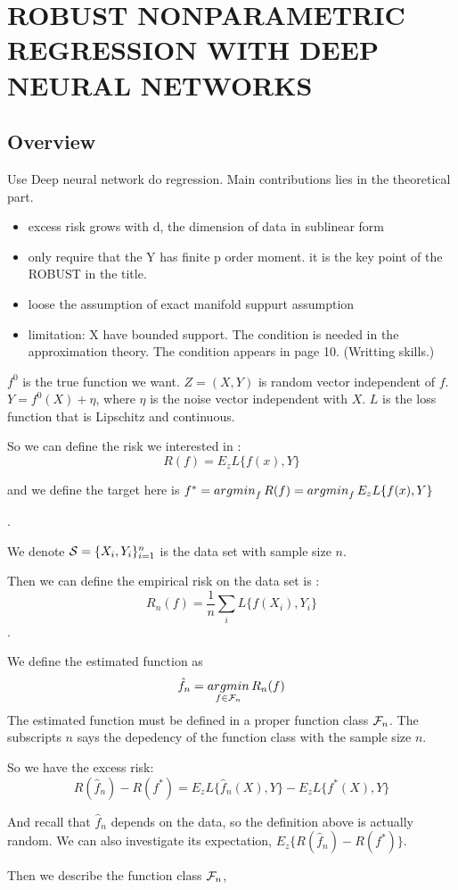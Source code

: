 
\chapter{ROBUST NONPARAMETRIC REGRESSION WITH DEEP NEURAL NETWORKS}
\section*{Overview}

Use Deep neural network do regression.
Main contributions lies in the theoretical part.
\begin{itemize}
  \item excess risk grows with d, the dimension of data in sublinear form
  \item only require that the Y has finite p order moment. it is the key point of the ROBUST in the title.
  \item loose the assumption of exact manifold suppurt assumption
  \item limitation: X have bounded support. The condition is needed in the approximation theory.
  The condition appears in page 10. (Writting skills.)
\end{itemize}

$f^0$ is the true function we want.
$Z= (X,Y)$ is random vector independent of $f$.  
$Y =  f^0(X) + \eta$, where $\eta$ is the noise vector independent with $X$.
$L$ is the loss function that is Lipschitz and continuous.


So we can define the risk we interested in :
$$
R(f) = E_z L\{f(x),Y\}
$$

and we define the target here is 
$f^* = \mathop{argmin}_f R(f) = \mathop{argmin}_f E_z L\{f(x),Y\}$

.

We denote $\mathcal{S} = \{X_i,Y_i\}_{i=1}^n$ is the data set with sample size $n$.

Then we can define the empirical risk on the data set is :
$$
R_n(f) = \frac{1}{n} \sum_i L\{f(X_i),Y_i\}
$$
.

We define the estimated function as
$$
\hat f_n = \mathop{argmin}\limits_{f\in \mathcal{F}_n} R_n(f)
$$
The estimated function must be defined in a proper function class $\mathcal{F}_n$. The subscripts $n$ says the depedency of the function class with the sample size $n$.

So we have the excess risk:
$$
R(\hat f_n) - R(f^*) = E_z L\{\hat f_n(X),Y\} - E_z L\{f^*(X),Y\}
$$

And recall that $\hat f_n$ depends on the data, so the definition above is actually random.
We can also investigate its expectation, $E_z\{R(\hat f_n) - R(f^*)\}$.

Then we describe the function class $\mathcal{F}_n$,